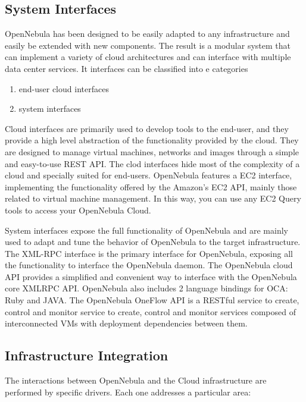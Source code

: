 \documentclass[9pt,twocolumn,twoside]{styles/osajnl}
\begin{document}
\subsection{System Interfaces}
OpenNebula has been designed to be easily adapted to any 
infrastructure and easily be extended with new components. The result 
is a modular system that can implement a variety of cloud 
architectures and can interface with multiple data center services. 
It interfaces can be classified into e categories

\begin{enumerate}
	\item end-user cloud interfaces
	\item system interfaces
\end{enumerate}

Cloud interfaces are primarily used to develop tools to the end-user, 
and they provide a high level abstraction of the functionality 
provided by the cloud. They are designed to manage virtual machines, 
networks and images through a simple and easy-to-use REST API. The 
clod interfaces hide most of the complexity of a cloud and specially 
suited for end-users. OpenNebula features a EC2 interface, 
implementing the functionality offered by the Amazon's EC2 API, 
mainly those related to virtual machine management. In this way, you 
can use any EC2 Query tools to access your OpenNebula Cloud.

{System interfaces}\cite{www-opennebula-systeminterfaces} expose the 
full functionality of OpenNebula and are 
mainly used to adapt and tune the behavior of OpenNebula to the 
target infrastructure. The XML-RPC interface is the primary interface 
for OpenNebula, exposing all the functionality to interface the 
OpenNebula daemon. The OpenNebula cloud API provides a simplified and 
convenient way to interface with the OpenNebula core XMLRPC API. 
OpenNebula also includes 2 language bindings for OCA: Ruby and JAVA. 
The OpenNebula OneFlow API is a RESTful service to create, control 
and monitor service to create, control and monitor services composed 
of interconnected VMs with deployment dependencies between them.

\subsection{Infrastructure Integration}

The interactions between OpenNebula and the {Cloud 
infrastructure}\cite{www-opennebula-infraintegration} are 
performed by specific drivers. Each one addresses a particular area:
\end{document}
